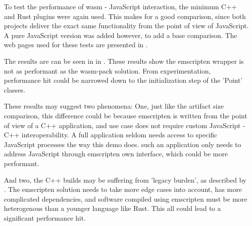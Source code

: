 To test the performance of \ac{wasm} - JavaScript interaction, the minimum C++ and Rust plugins were again used. 
This makes for a good comparison, since both projects deliver the exact same functionality from the point of view of JavaScript.  
A pure JavaScript version was added however, to add a base comparison.
The web pages used for these tests are presented in .




The results are can be seen in in .
These results show the emscripten wrapper is not as performant as the wasm-pack solution.
From experimentation, performance hit could be narrowed down to the initialization step of the 'Point' classes. 

These results may suggest two phenomena:
One, just like the artifact size comparison, this difference could be because emscripten is written from the point of view of a C++ application, and use case does not require custom JavaScript - C++ interoperability. 
A full application seldom needs access to specific JavaScript processes the way this demo does. 
such an application only needs to address JavaScript through emscripten own interface, which could be more performant. 

And two, the C++ builds may be suffering from 'legacy burden', as described by \citet{ammann_maplibre-rs_2022}. 
The emscripten solution needs to take more edge cases into account, has more complicated dependencies, and software compiled using emscripten must be more heterogenous than a younger language like Rust.
This all could lead to a significant performance hit.

